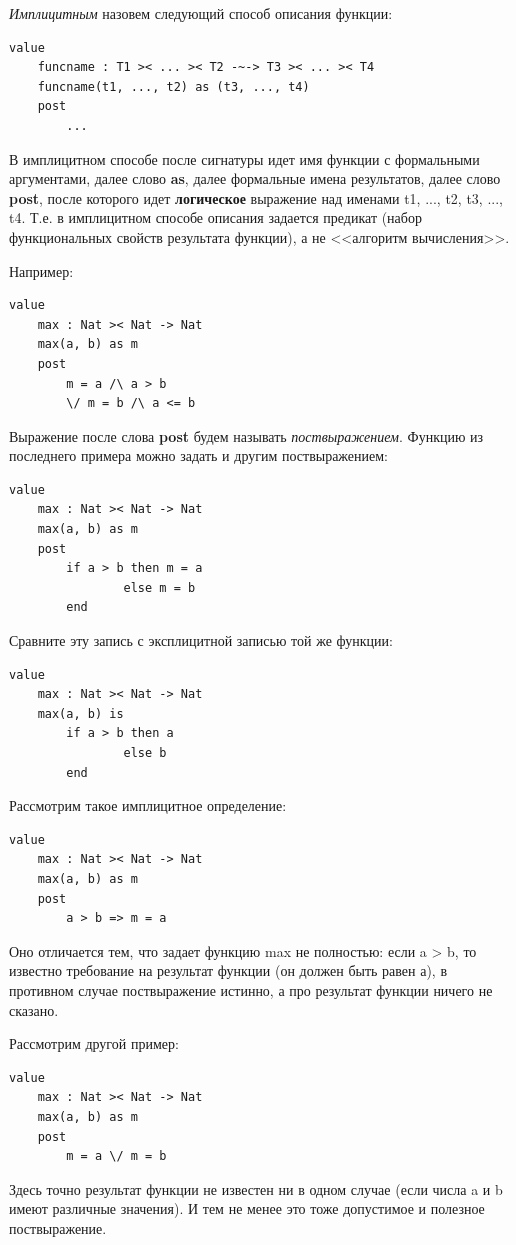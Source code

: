 \documentclass[14pt, twoside]{extreport}
\begin{document}
\emph{Имплицитным} назовем следующий способ описания функции:
\begin{lstlisting}
value
	funcname : T1 >< ... >< T2 -~-> T3 >< ... >< T4
	funcname(t1, ..., t2) as (t3, ..., t4)
	post
		... 
\end{lstlisting}

В имплицитном способе после сигнатуры идет имя функции с формальными аргументами, далее слово \textbf{as}, далее формальные имена результатов, далее слово \textbf{post}, после которого идет \textbf{логическое} выражение над именами t1, ..., t2, t3, ..., t4. Т.е. в имплицитном способе описания задается предикат (набор функциональных свойств результата функции), а не <<алгоритм вычисления>>. 

Например:
\begin{lstlisting}
value
	max : Nat >< Nat -> Nat
	max(a, b) as m
	post
		m = a /\ a > b
		\/ m = b /\ a <= b
\end{lstlisting}

Выражение после слова \textbf{post} будем называть \emph{поствыражением}. Функцию из последнего примера можно задать и другим поствыражением:
\begin{lstlisting}
value
	max : Nat >< Nat -> Nat
	max(a, b) as m
	post
		if a > b then m = a 
				else m = b
		end
\end{lstlisting}

Сравните эту запись с эксплицитной записью той же функции:
\begin{lstlisting}
value
	max : Nat >< Nat -> Nat
	max(a, b) is
		if a > b then a 
				else b
		end
\end{lstlisting}


Рассмотрим такое имплицитное определение:
\begin{lstlisting}
value
	max : Nat >< Nat -> Nat
	max(a, b) as m
	post
		a > b => m = a
\end{lstlisting}

Оно отличается тем, что задает функцию max не полностью: если a > b, то известно требование на результат функции (он должен быть равен а), в противном случае поствыражение истинно, а про результат функции ничего не сказано.

Рассмотрим другой пример:
\begin{lstlisting}
value
	max : Nat >< Nat -> Nat
	max(a, b) as m
	post
		m = a \/ m = b
\end{lstlisting}

Здесь точно результат функции не известен ни в одном случае (если числа a и b имеют различные значения). И тем не менее это тоже допустимое и полезное поствыражение.
\end{document}
